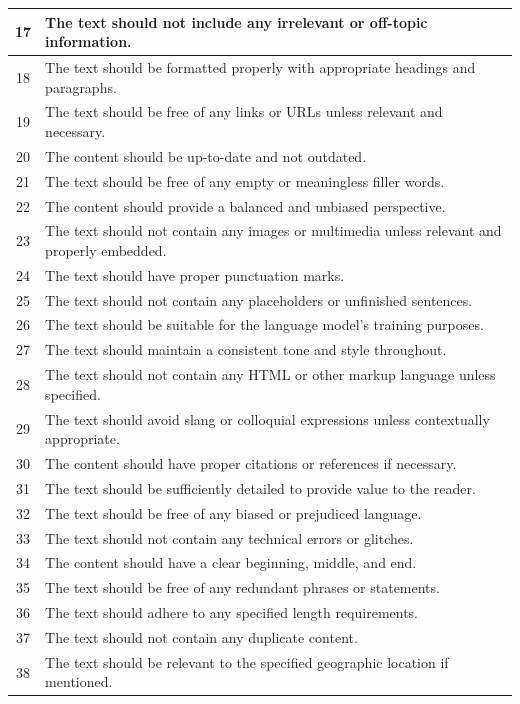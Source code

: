 \documentclass{article}
\begin{document}
\begin{longtable}{c|p{14cm}}
\hline
17 & The text should not include any irrelevant or off-topic information. \\
\hline
18 & The text should be formatted properly with appropriate headings and paragraphs. \\
\hline
19 & The text should be free of any links or URLs unless relevant and necessary. \\
\hline
20 & The content should be up-to-date and not outdated. \\
\hline
21 & The text should be free of any empty or meaningless filler words. \\
\hline
22 & The content should provide a balanced and unbiased perspective. \\
\hline
23 & The text should not contain any images or multimedia unless relevant and properly embedded. \\
\hline
24 & The text should have proper punctuation marks. \\
\hline
25 & The text should not contain any placeholders or unfinished sentences. \\
\hline
26 & The text should be suitable for the language model's training purposes. \\
\hline
27 & The text should maintain a consistent tone and style throughout. \\
\hline
28 & The text should not contain any HTML or other markup language unless specified. \\
\hline
29 & The text should avoid slang or colloquial expressions unless contextually appropriate. \\
\hline
30 & The content should have proper citations or references if necessary. \\
\hline
31 & The text should be sufficiently detailed to provide value to the reader. \\
\hline
32 & The text should be free of any biased or prejudiced language. \\
\hline
33 & The text should not contain any technical errors or glitches. \\
\hline
34 & The content should have a clear beginning, middle, and end. \\
\hline
35 & The text should be free of any redundant phrases or statements. \\
\hline
36 & The text should adhere to any specified length requirements. \\
\hline
37 & The text should not contain any duplicate content. \\
\hline
38 & The text should be relevant to the specified geographic location if mentioned. \\

\end{longtable}
\end{document}
